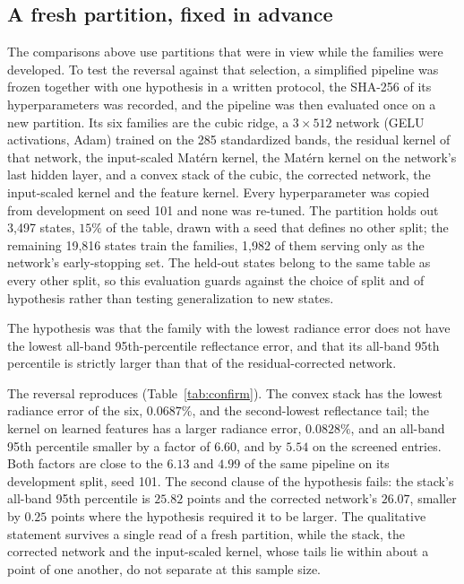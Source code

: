\subsection{A fresh partition, fixed in advance}\label{sec:confirm}
The comparisons above use partitions that were in view while the families were developed. To test
the reversal against that selection, a simplified pipeline was frozen together with one hypothesis
in a written protocol, the SHA-256 of its hyperparameters was recorded, and the pipeline was then
evaluated once on a new partition. Its six families are the cubic ridge, a $3\times512$ network
(GELU activations, Adam) trained on the 285 standardized bands, the residual kernel of that
network, the input-scaled Mat\'ern kernel, the Mat\'ern kernel on the network's last hidden layer,
and a convex stack of the cubic, the corrected network, the input-scaled kernel and the feature
kernel. Every hyperparameter was copied from development on seed 101 and none was re-tuned. The
partition holds out 3{,}497 states, $15\%$ of the table, drawn with a seed that defines no other split;
the remaining 19{,}816 states train the families, 1{,}982 of them serving only as the network's
early-stopping set. The held-out states belong to the same table as every other split, so this
evaluation guards against the choice of split and of hypothesis rather than testing
generalization to new states.

The hypothesis was that the family with the lowest radiance error does not have the lowest
all-band 95th-percentile reflectance error, and that its all-band 95th percentile is strictly larger
than that of the residual-corrected network.

\begin{table}[t]
\centering
\resizebox{\textwidth}{!}{}
\caption{The fresh partition: 3{,}497 held-out states, evaluated once. The screened columns use
$t\ge10^{-12}$ and $q\ge0.3$, which covers $99.5327\%$ of the $996{,}645$ entries; no inversion is
non-finite in any family. The network here is the $3\times512$ GELU network of the frozen pipeline,
trained with Adam, not the network of Table~\ref{tab:results}.}
\label{tab:confirm}
\end{table}

The reversal reproduces (Table~\ref{tab:confirm}). The convex stack has the lowest radiance error of
the six, $0.0687\%$, and the second-lowest reflectance tail; the kernel on learned features has a
larger radiance error, $0.0828\%$, and an all-band 95th percentile smaller by a factor of $6.60$, and
by $5.54$ on the screened entries. Both factors are close to the $6.13$ and $4.99$ of the same
pipeline on its development split, seed 101. The second clause of the hypothesis fails: the stack's
all-band 95th percentile is $25.82$ points and the corrected network's $26.07$, smaller by $0.25$
points where the hypothesis required it to be larger. The qualitative statement survives a single
read of a fresh partition, while the stack, the corrected network and the input-scaled kernel, whose
tails lie within about a point of one another, do not separate at this sample size.

